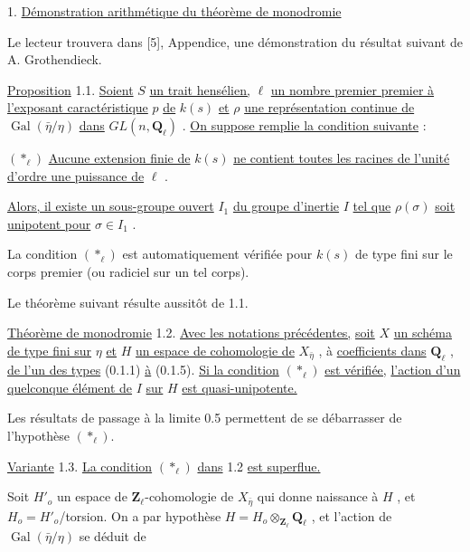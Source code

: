 1.  \underline{Démonstration arithmétique du théorème de monodromie}

Le lecteur trouvera dans  [5], Appendice, une démonstration du résultat suivant de A. Grothendieck.

\underline{Proposition} 1.1.  \underline{Soient}  $S$  \underline{un trait hensélien,}  $\ell$  \underline{un nombre premier premier à l'exposant caractéristique}  $p$  \underline{de}  $k(s)$  \underline{et}  $\rho$  \underline{une représentation continue de}  $\operatorname{Gal}(\bar\eta/\eta)$  \underline{dans}  $GL(n,\mathbf{Q}_\ell)$ . \underline{On suppose remplie la condition suivante} :

$(*_\ell)$      \underline{Aucune extension finie de}  $k(s)$  \underline{ne contient toutes les racines de l'unité d'ordre une puissance de}  $\ell$ .



\underline{Alors, il existe un sous-groupe ouvert}  $I_1$  \underline{du groupe d'inertie}  $I$  \underline{tel que}  $\rho(\sigma)$  \underline{soit unipotent pour}  $\sigma \in I_1$ .

La condition  $(*_\ell)$  est automatiquement vérifiée pour  $k(s)$  de type fini sur le corps premier (ou radiciel sur un tel corps).

Le théorème suivant résulte aussitôt de 1.1.

\underline{Théorème de monodromie} 1.2.  \underline{Avec les notations précédentes,} \underline{soit}  $X$  \underline{un schéma de type fini sur}  $\eta$  \underline{et}  $H$  \underline{un espace de cohomologie de}  $X_{\bar\eta}$ , à \underline{coefficients dans}  $\mathbf{Q}_\ell$ , \underline{de  l'un des types} (0.1.1) \underline{à} (0.1.5). \underline{Si la condition}  $(*_\ell)$  \underline{est vérifiée,} \underline{l'action d'un quelconque élément de}  $I$  \underline{sur}  $H$  \underline{est quasi-unipotente.}

Les résultats de passage à la limite 0.5 permettent de se débarrasser de l'hypothèse  $(*_\ell)$.

\underline{Variante} 1.3.  \underline{La condition}  $(*_\ell)$  \underline{dans} 1.2 \underline{est superflue.}

Soit  $H'_o$  un espace de  $\mathbf{Z}_\ell$-cohomologie de  $X_{\bar\eta}$  qui donne naissance à  $H$ , et  $H_o = H'_o$/torsion. On a par hypothèse  $H = H_o \otimes_{\mathbf{Z}_\ell} \mathbf{Q}_\ell$ , et l'action de  $\operatorname{Gal}(\bar\eta/\eta)$  se déduit de

